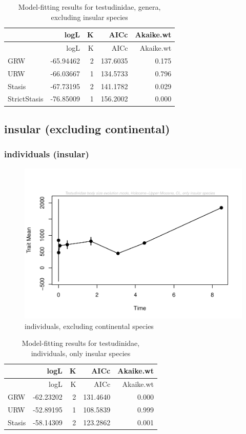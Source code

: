 \documentclass[]{article}
\begin{document}
\begin{longtable}[]{@{}lrrrr@{}}
\caption{Model-fitting results for testudinidae, genera, excluding
insular species}\tabularnewline
\toprule
& logL & K & AICc & Akaike.wt\tabularnewline
\midrule
\endfirsthead
\toprule
& logL & K & AICc & Akaike.wt\tabularnewline
\midrule
\endhead
GRW & -65.94462 & 2 & 137.6035 & 0.175\tabularnewline
URW & -66.03667 & 1 & 134.5733 & 0.796\tabularnewline
Stasis & -67.73195 & 2 & 141.1782 & 0.029\tabularnewline
StrictStasis & -76.85009 & 1 & 156.2002 & 0.000\tabularnewline
\bottomrule
\end{longtable}

\newpage

\subsection{insular (excluding
continental)}\label{insular-excluding-continental}

\subsubsection{individuals (insular)}\label{individuals-insular}

\begin{figure}[htbp]
\centering
\includegraphics{MA_JJ_files/figure-latex/paleoTS, individuals, exluding continental species-1.pdf}
\caption{individuals, excluding continental species}
\end{figure}

\begin{longtable}[]{@{}lrrrr@{}}
\caption{Model-fitting results for testudinidae, individuals, only
insular species}\tabularnewline
\toprule
& logL & K & AICc & Akaike.wt\tabularnewline
\midrule
\endfirsthead
\toprule
& logL & K & AICc & Akaike.wt\tabularnewline
\midrule
\endhead
GRW & -62.23202 & 2 & 131.4640 & 0.000\tabularnewline
URW & -52.89195 & 1 & 108.5839 & 0.999\tabularnewline
Stasis & -58.14309 & 2 & 123.2862 & 0.001\tabularnewline
\bottomrule
\end{longtable}
\end{document}

